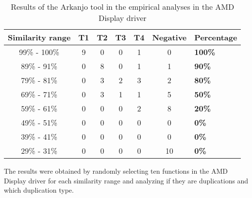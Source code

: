 \begin{table}
\begin{tabular}{ | c | c | c | c | c | c | m{8em} | }

\hline

\textbf{Similarity range} & \textbf{T1} & \textbf{T2} & \textbf{T3} & \textbf{T4}
& \textbf{Negative} & \textbf{Percentage} \\ \hline 
99\% - 100\% & 9 & 0 & 0 & 1 & 0 & \textbf{100\%} \\ \hline
89\% - 91\% & 0 & 8 & 0 & 1 & 1 & \textbf{90\%} \\ \hline
79\% - 81\% & 0 & 3 & 2 & 3 & 2 & \textbf{80\%} \\ \hline
69\% - 71\% & 0 & 3 & 1 & 1 & 5 & \textbf{50\%} \\ \hline
59\% - 61\% & 0 & 0 & 0 & 2 & 8 & \textbf{20\%} \\ \hline
49\% - 51\% & 0 & 0 & 0 & 0 & 0 & \textbf{0\%} \\ \hline
39\% - 41\% & 0 & 0 & 0 & 0 & 0 & \textbf{0\%} \\ \hline
29\% - 31\% & 0 & 0 & 0 & 0 & 10 & \textbf{0\%} \\ \hline

\hline

\end{tabular}
\caption{Results of the Arkanjo tool in the empirical analyses in the AMD Display driver}
\label{tab:emp}

The results were obtained by randomly selecting ten functions in the AMD Display driver for 
each similarity range and analyzing if they are duplications and which duplication type.

\end{table}
